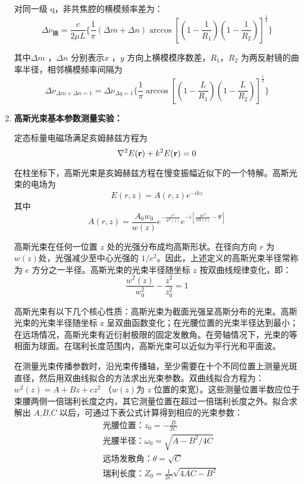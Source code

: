 \documentclass[dvipsnames, svgnames,a4paper,11pt]{article}
\begin{document}
\begin{enumerate}
			对同一级 q，非共焦腔的横模频率差为：
			\[
				\Delta \nu_{\text{横}} = \frac{c}{2 \mu L} \{ \frac{1}{\pi} (\Delta m + \Delta n) \arccos[(1 - \frac{1}{R_1}) (1 - \frac{1}{R_2})]^{\frac{1}{2}} \}
			\]

			其中$\Delta m$ ，$\Delta n$ 分别表示$x$ ，$y$ 方向上横模模序数差，$R_1$，$R_2$ 为两反射镜的曲率半径，相邻横模频率间隔为
			\[
				\Delta \nu_{\Delta m + \Delta n = 1} = \Delta \nu_{\Delta q = 1} \{ \frac{1}{\pi} \arccos[(1 - \frac{L}{R_1})(1 - \frac{L}{R_2})]^{\frac{1}{2}} \}
			\]

			
		\item \textbf{高斯光束基本参数测量实验：}
		
			定态标量电磁场满足亥姆赫兹方程为
			\[
				\laplacian{E(\mathbf{r})} + k^2 E(\mathbf{r}) = 0
			\]
			
			在柱坐标下，高斯光束是亥姆赫兹方程在慢变振幅近似下的一个特解。高斯光束的电场为
			\[
				E(r, z) = A(r, z) e^{-ikz}
			\]
			其中
			\[
				A(r, z) = \frac{A_0 w_0}{w(z)} e^{-\frac{r^2}{w^2(z)}} e^{-i[\frac{k r^2}{2 R(z)} - \Psi]}
			\]

			高斯光束在任何一位置 $z$ 处的光强分布成均高斯形状。在径向方向 $r$ 为 $w(z)$处，光强减少至中心光强的 $1/e^2$。因此，上述定义的高斯光束半径常称为 $e$ 方分之一半径。高斯光束的光束半径随坐标 $z$ 按双曲线规律变化，即：
			\[
				\frac{w^2(z)}{w_0^2} - \frac{z^2}{z_0^2} = 1
			\]
			
			高斯光束有以下几个核心性质：高斯光束为截面光强呈高斯分布的光束。高斯光束的光束半径随坐标 z 呈双曲函数变化；在光腰位置的光束半径达到最小；在远场情况，高斯光束有近衍射极限的固定发散角。在旁轴情况下，光束的等相面为球面。在瑞利长度范围内，高斯光束可以近似为平行光和平面波。

			在测量光束传播参数时，沿光束传播轴，至少需要在十个不同位置上测量光斑直径，然后用双曲线拟合的方法求出光束参数。双曲线拟合方程为：$w^2(z) = A + B z + c z^2$ （$w(z)$为 $z$ 位置的束宽）。这些测量位置半数应位于束腰两侧一倍瑞利长度之内，其它测量位置在超过一倍瑞利长度之外。拟合求解出 $A$,$B$,$C$ 以后，可通过下表公式计算得到相应的光束参数：
			\begin{align}
				&\text{光腰位置：} z_0 = - \frac{B}{2C}	\nonumber	\\
				&\text{光腰半径：} \omega_0 = \sqrt{A - B^2/4C}	\nonumber	\\
				&\text{远场发散角：} \theta = \sqrt{C}	\nonumber	\\
				&\text{瑞利长度：} Z_0 = \frac{1}{2C} \sqrt{4AC - B^2}	\nonumber
			\end{align}



\end{enumerate}
\end{document}
